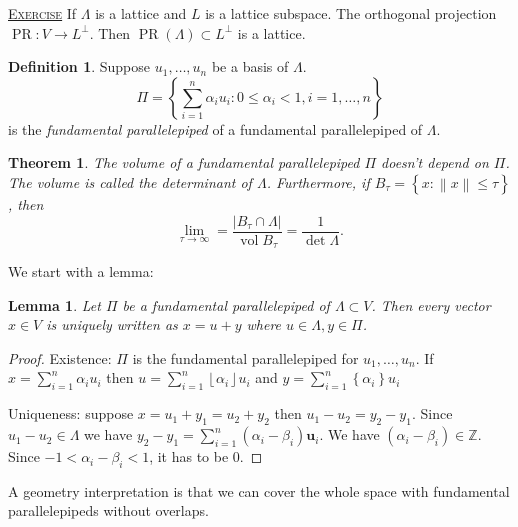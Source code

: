 \documentclass{report}
\newcommand{\Z}{\mathbb{Z}}
\newcommand{\norm}[1]{\left\| #1 \right\|}
\newcommand{\floor}[1]{\left\lfloor #1 \right\rfloor}
\newcommand{\set}[1]{\left\{ #1 \right\}}
\newcommand{\fancyem}[1]{\underline{\textsc{#1}}}
\newtheorem{theorem}{Theorem}[section]
\newtheorem{lemma}{Lemma}[section]
\theoremstyle{definition}
\newtheorem{definition}{Definition}[section]
\theoremstyle{remark}
\numberwithin{equation}{section}
\begin{document}
\fancyem{Exercise} If $\Lambda$ is a lattice and $L$ is a lattice subspace. The orthogonal projection $\operatorname{PR}: V \to L^{\perp}$. Then $\operatorname{PR}(\Lambda) \subset L^\perp$ is a lattice.

\begin{definition}
    Suppose $u_1, \ldots, u_n$ be a basis of $\Lambda$. 
    \[\Pi=\set{\sum_{i=1}^n \alpha_i u_i: 0 \leq \alpha_i < 1, i = 1, \ldots, n}\] is the \emph{fundamental parallelepiped} of a fundamental parallelepiped of $\Lambda$.
\end{definition}
\begin{theorem}
    The volume of a fundamental parallelepiped $\Pi$ doesn't depend on $\Pi$. The volume is called the determinant of $\Lambda$. Furthermore, if $B_{\tau} = \set{x: \norm{x} \leq \tau}$, then \[\lim_{\tau \to \infty} = \frac{|B_\tau \cap \Lambda|}{\operatorname{vol}B_\tau} = \frac{1}{\det \Lambda}.\]
\end{theorem}
We start with a lemma:
\begin{lemma}
    Let $\Pi$ be a fundamental parallelepiped of $\Lambda \subset V$. Then every vector $x \in V$ is uniquely written as $x = u + y$ where $u \in \Lambda, y \in \Pi$.
\end{lemma}
\begin{proof}
    Existence: $\Pi$ is the fundamental parallelepiped for $u_1, \ldots, u_n$. If $x = \sum_{i=1}^n \alpha_i u_i$ then $u = \sum_{i=1}^n \floor{\alpha_i} u_i$ and $y = \sum_{i=1}^n \set{\alpha_i} u_i$

    Uniqueness: suppose $x = u_1 + y_1 = u_2 + y_2$ then $u_1 - u_2 = y_2 - y_1$. Since $u_1 - u_2 \in \Lambda$ we have $y_2 - y_1 = \sum_{i=1}^n (\alpha_i - \beta_i)\mathbf{u}_i$. We have $(\alpha_i - \beta_i) \in \Z$. Since $-1 < \alpha_i - \beta_i < 1$, it has to be $0$.
\end{proof}
A geometry interpretation is that we can cover the whole space with fundamental parallelepipeds without overlaps.
\end{document}
